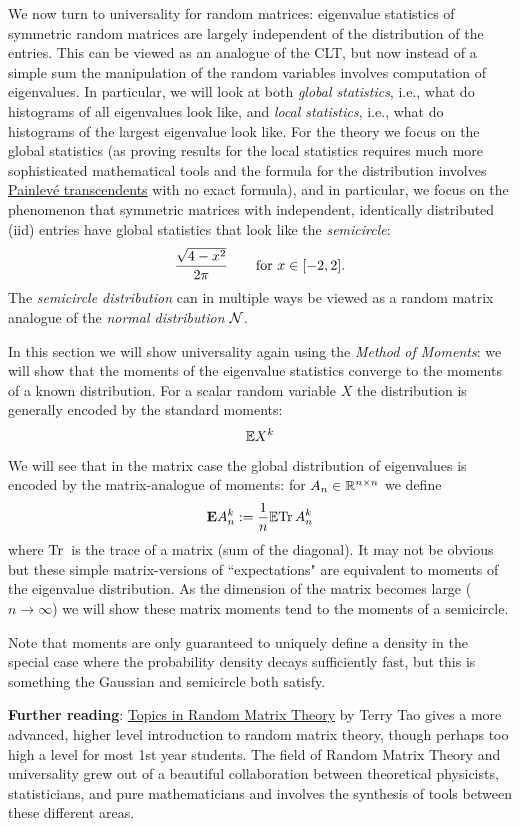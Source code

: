 We now turn to universality for random matrices: eigenvalue statistics of symmetric random matrices are largely independent of the distribution of the entries. This can be viewed as an analogue of the CLT, but now instead of a simple sum the manipulation of the random variables involves computation of eigenvalues.  In particular, we will look at both \emph{global statistics}, i.e., what do histograms of all eigenvalues look like, and \emph{local statistics}, i.e., what do histograms of the largest eigenvalue look like. For the theory we focus on the global statistics (as proving results for the local statistics requires much more sophisticated  mathematical tools and the formula for the distribution involves \href{https://en.wikipedia.org/wiki/Painlevé_transcendents}{Painlevé transcendents} with no exact formula), and in particular, we focus on the phenomenon that symmetric matrices with independent, identically distributed (iid) entries have global statistics that look like the \emph{semicircle}:
\[
{\sqrt{4-x^2} \over 2\ensuremath{\pi}} \qquad \text{for } x \in [-2, 2].
\]
The \emph{semicircle distribution} can in multiple ways be viewed as a random matrix analogue of  the \emph{normal distribution} ${\cal N}$.

In this section we will show universality again using the \emph{Method of Moments}: we will show that the moments of the eigenvalue statistics converge to the moments of a known distribution. For a scalar random variable $X$ the distribution is generally encoded by the standard moments:
\[
{\mathbb E} X^k
\]
We will see that in the matrix case the global distribution of eigenvalues is encoded by the matrix-analogue of moments: for $A_n \in {\mathbb R}^{n \times n}$ we define
\[
\bm{\mathrm{E}} A_n^k := {1 \over n} {\mathbb E} {\rm Tr}\, A_n^k
\]
where ${\rm Tr}\,$ is the trace of a matrix (sum of the diagonal).  It may not be obvious but these simple matrix-versions of ``expectations" are equivalent to moments of the eigenvalue distribution. As the dimension of the matrix becomes large ($n \ensuremath{\rightarrow} \ensuremath{\infty}$) we will show these matrix moments tend to the moments of a semicircle.

Note that moments are only guaranteed to uniquely define a density in the special case where the probability density decays sufficiently fast, but this is something the Gaussian and semicircle both satisfy.

\textbf{Further reading}: \href{https://terrytao.wordpress.com/wp-content/uploads/2011/02/matrix-book.pdf}{Topics in Random Matrix Theory} by Terry Tao gives a more advanced, higher level introduction to random matrix theory, though perhaps too high a level for most 1st year students. The field of Random Matrix Theory and universality grew out of a beautiful collaboration between theoretical physicists, statisticians, and pure mathematicians and involves the synthesis of tools between these different areas.

